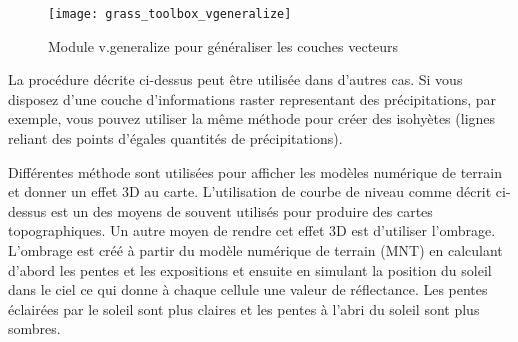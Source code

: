 {\begin{figure}[ht]
 \begin{center}
 \texttt{[image: grass\_toolbox\_vgeneralize]}
 \caption{Module \grass v.generalize pour généraliser les couches vecteurs \nixcaption}\label{fig:grass_toolbox_vgeneralize}
 \end{center}
\end{figure}

\begin{Tip}\caption{\textsc{Autres utilisations de r.contour}}
La procédure décrite ci-dessus peut être utilisée dans d'autres cas. Si vous disposez d'une couche d'informations raster representant des précipitations, par exemple, vous pouvez utiliser la même méthode pour créer des isohyètes (lignes reliant des points d'égales quantités de précipitations).
\end{Tip}  



Différentes méthode sont utilisées pour afficher les modèles numérique de terrain et donner un effet 3D au carte.
L'utilisation de courbe de niveau comme décrit ci-dessus est un des moyens de souvent utilisés pour produire des cartes topographiques.
Un autre moyen de rendre cet effet 3D est d'utiliser l'ombrage. L'ombrage est créé à partir du modèle numérique de terrain (MNT) en calculant d'abord les pentes et les expositions et ensuite en simulant la position du soleil dans le ciel ce qui donne à chaque cellule une valeur de réflectance. Les pentes éclairées par le soleil sont plus claires et les pentes à l'abri du soleil sont plus sombres.

}

